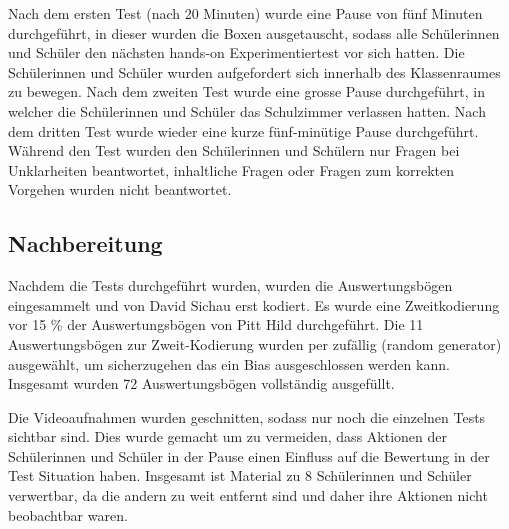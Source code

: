 Nach dem ersten Test (nach 20 Minuten) wurde eine Pause von fünf Minuten durchgeführt, in dieser wurden die Boxen ausgetauscht, sodass alle Schülerinnen und Schüler den nächsten hands-on Experimentiertest vor sich hatten. Die Schülerinnen und Schüler wurden aufgefordert sich innerhalb des Klassenraumes zu bewegen. Nach dem zweiten Test wurde eine grosse Pause durchgeführt, in welcher die Schülerinnen und Schüler das Schulzimmer verlassen hatten. Nach dem dritten Test wurde wieder eine kurze fünf-minütige Pause durchgeführt. Während den Test wurden den Schülerinnen und Schülern nur Fragen bei Unklarheiten beantwortet, inhaltliche Fragen oder Fragen zum korrekten Vorgehen wurden nicht beantwortet. 

\subsection{Nachbereitung}

Nachdem die Tests durchgeführt wurden, wurden die Auswertungsbögen eingesammelt und von David Sichau erst kodiert. Es wurde eine Zweitkodierung vor 15 \% der Auswertungsbögen von Pitt Hild durchgeführt. Die 11 Auswertungsbögen zur Zweit-Kodierung wurden per zufällig (random generator) ausgewählt, um sicherzugehen das ein Bias ausgeschlossen werden kann. Insgesamt wurden 72 Auswertungsbögen vollständig ausgefüllt. 

Die Videoaufnahmen wurden geschnitten, sodass nur noch die einzelnen Tests sichtbar sind. Dies wurde gemacht um zu vermeiden, dass Aktionen der Schülerinnen und Schüler in der Pause einen Einfluss auf die Bewertung in der Test Situation haben. Insgesamt ist Material zu 8 Schülerinnen und Schüler verwertbar, da die andern zu weit entfernt sind und daher ihre Aktionen nicht beobachtbar waren.

